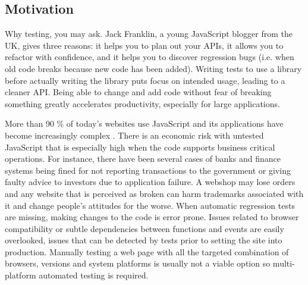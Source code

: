 \documentclass[11pt]{article}
\begin{document}
\subsection{Motivation}

Why testing, you may ask. Jack Franklin, a young JavaScript blogger from the UK, gives three reasons: it helps you to plan out your APIs, it allows you to refactor with confidence, and it helps you to discover regression bugs (i.e. when old code breaks because new code has been added). Writing tests to use a library before actually writing the library puts focus on intended usage, leading to a cleaner API. Being able to change and add code without fear of breaking something greatly accelerates productivity, especially for large applications. \cite{JackFranklin}

More than 90 \% of today's websites use JavaScript\cite{BusinessJavascript} and its applications have become increasingly complex \cite[question~23]{Ekelof}. There is an economic risk with untested JavaScript that is especially high when the code supports business critical operations. For instance, there have been several cases of banks and finance systems being fined for not reporting transactions to the government\cite{Bug1} or giving faulty advice to investors\cite{Bug2} due to application failure. A webshop may lose orders and any website that is perceived as broken can harm trademarks associated with it and change people's attitudes for the worse. When automatic regression tests are missing, making changes to the code is error prone. Issues related to browser compatibility or subtle dependencies between functions and events are easily overlooked, issues that can be detected by tests prior to setting the site into production. Manually testing a web page with all the targeted combination of browsers, versions and system platforms is usually not a viable option\cite{TestSwarm} so multi-platform automated testing is required.
\end{document}
